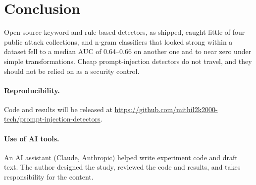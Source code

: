 \documentclass[11pt]{article}
\begin{document}
\section{Conclusion}
Open-source keyword and rule-based detectors, as shipped, caught little of four public attack collections, and n-gram
classifiers that looked strong within a dataset fell to a median AUC of 0.64--0.66 on another one and to near zero under
simple transformations. Cheap prompt-injection detectors do not travel, and they should not be relied on as a security
control.

\paragraph{Reproducibility.} Code and results will be released at
\newline\url{https://github.com/mithil2k2000-tech/prompt-injection-detectors}.

\paragraph{Use of AI tools.} An AI assistant (Claude, Anthropic) helped write experiment code and draft text. The author designed the study,
reviewed the code and results, and takes responsibility for the content.



\end{document}
